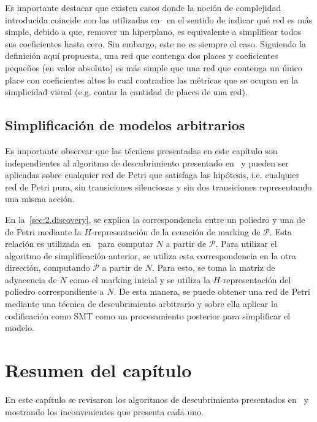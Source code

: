 Es importante destacar que existen casos donde la noción de complejidad introducida coincide con las utilizadas
en~\cite{Lassen08,Mendling2007} en el sentido de indicar qué red es más simple, debido a que, remover un hiperplano,
es equivalente a simplificar todos sus coeficientes hasta cero. Sin embargo, este no es siempre el caso.
Siguiendo la definición aquí propuesta, una red que contenga
dos places y coeficientes pequeños (en valor absoluto) es más simple que una red que contenga un único place con 
coeficientes altos lo cual contradice las métricas que se ocupan en la simplicidad visual (e.g. contar la cantidad
de places de una red).

\subsection{Simplificación de modelos arbitrarios}
\label{sec:3.simplification}

Es importante observar que las técnicas presentadas en este capítulo son independientes al algoritmo de 
descubrimiento presentado en~\cite{CarmonaC14} y pueden ser aplicadas sobre cualquier
red de Petri que satisfaga las hipótesis, i.e. cualquier red de Petri pura, sin transiciones silenciosas y sin
dos transiciones representando una misma acción. 

En la~\autoref{sec:2.discovery}, se explica la correspondencia entre un poliedro y una de de Petri mediante
la $H$-representación de la ecuación de marking de $\mathcal{P}$. Esta relación es utilizada en~\cite{CarmonaC14}
para computar $N$ a partir de $\mathcal{P}$. Para utilizar el algoritmo de simplificación anterior, se utiliza
esta correspondencia en la otra dirección, computando $\mathcal{P}$ a partir de $N$. 
Para esto, se toma la matriz de adyacencia de $N$ como el marking inicial y se utiliza la 
$H$-representación del poliedro correspondiente a $N$. 
De esta manera, se puede obtener una red de Petri mediante una técnica de descubrimiento arbitrario
y sobre ella aplicar la codificación como SMT como un procesamiento posterior para simplificar el modelo.

\section{Resumen del capítulo}
\label{sec:3.resumen}

En este capítulo se revisaron los algoritmos de descubrimiento presentados en~\cite{CarmonaC14} y~\cite{LeonCB15}
mostrando los inconvenientes que presenta cada uno. 

